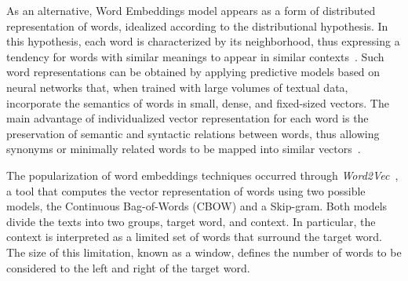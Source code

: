 \documentclass{ieeeaccess}
\begin{document}

As an alternative, Word Embeddings model appears as a form of distributed representation of words, idealized according to the distributional hypothesis. In this hypothesis, each word is characterized by its neighborhood, thus expressing a tendency for words with similar meanings to appear in similar contexts~\cite{firth1957}. Such word representations can be obtained by applying predictive models based on neural networks that, when trained with large volumes of textual data, incorporate the semantics of words in small, dense, and fixed-sized vectors. The main advantage of individualized vector representation for each word is the preservation of semantic and syntactic relations between words, thus allowing synonyms or minimally related words to be mapped into similar vectors~\cite{li2015word}. %


The popularization of word embeddings techniques occurred through \textit{Word2Vec}~\cite{mikolov2013efficient}, a tool that computes the vector representation of words using two possible models, the Continuous Bag-of-Words (CBOW) and a Skip-gram. Both models divide the texts into two groups, target word, and context. In particular, the context is interpreted as a limited set of words that surround the target word. The size of this limitation, known as a window, defines the number of words to be considered to the left and right of the target word.
\end{document}
